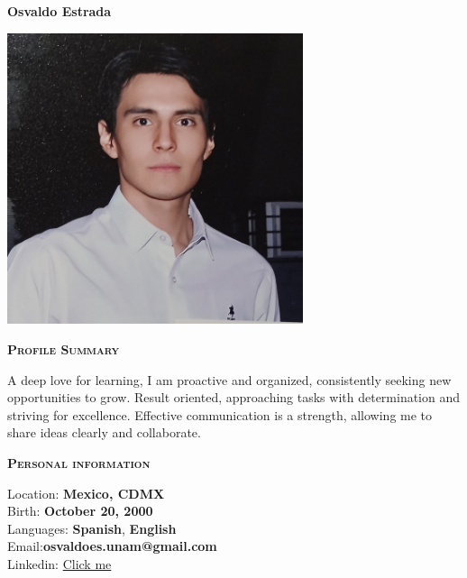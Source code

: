 \documentclass[11pt, a4paper]{article}
\newcommand{\headleft}[1]{\vspace*{3ex}\textsc{\textbf{#1}}\par%
    \vspace*{-1.5ex}\hrulefill\par\vspace*{0.7ex}}
\begin{document}
\setlength{\topskip}{0pt}
\setlength{\parindent}{0pt}
\setlength{\parskip}{0pt}
\setlength{\fboxsep}{0pt}
\pagestyle{empty}
\raggedbottom

\begin{minipage}[t]{0.33\textwidth} %
\colorbox{cvblue}{\begin{minipage}[t][5mm][t]{\textwidth}\null\hfill\null\end{minipage}}

\vspace{-.2ex} %
\colorbox{cvblue!90}{\color{white}  %
\textwidth\relax%
\begin{minipage}[t][293mm][t]{0.82\textwidth}
\raggedright
\vspace*{2.5ex}

\Large \textbf{Osvaldo Estrada} \normalsize

\null\hfill\includegraphics[width=0.65\textwidth]{osvaldo.jpg}\hfill\null

\vspace*{0.5ex} %

\headleft{Profile Summary}
A deep love for learning, I am
proactive and organized, consistently
seeking new opportunities to grow.
Result oriented, approaching tasks
with determination and striving for
excellence. Effective communication
is a strength, allowing me to share
ideas clearly and collaborate.


\headleft{Personal information}
Location: \textbf{Mexico, CDMX} \\[0.5ex]
Birth: \textbf{October 20, 2000} \\[0.5ex]
Languages: \textbf{Spanish}, \textbf{English} \\[0.5ex]
Email:\textbf{osvaldoes.unam@gmail.com} \\[0.5ex]
Linkedin: \href{https://www.linkedin.com/in/osvaldo-israel-estrada-sosa-19529919a/}{Click me}


\end{minipage}}
\end{minipage}
\end{document}
